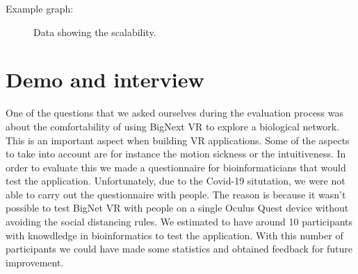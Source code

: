 Example graph:
\begin{figure}[h]

\caption{Data showing the scalability.}
\label{fig:graph_scalability}
\end{figure}

\section{Demo and interview}
One of the questions that we asked ourselves during the evaluation process was about the comfortability of using BigNext VR to explore a biological network. This is an important aspect when building VR applications. Some of the aspects to take into account are for instance the motion sickness or the intuitiveness. In order to evaluate this we made a questionnaire for bioinformaticians that would test the application. Unfortunately, due to the Covid-19 situtation\cite{covid_19}, we were not able to carry out the questionnaire with people. The reason is because it wasn't possible to test BigNet VR with people on a single Oculus Quest device without avoiding the social distancing rules.
We estimated to have around 10 participants with knowdledge in bioinformatics to test the application. With this number of participants we could have made some statistics and obtained feedback for future improvement.

